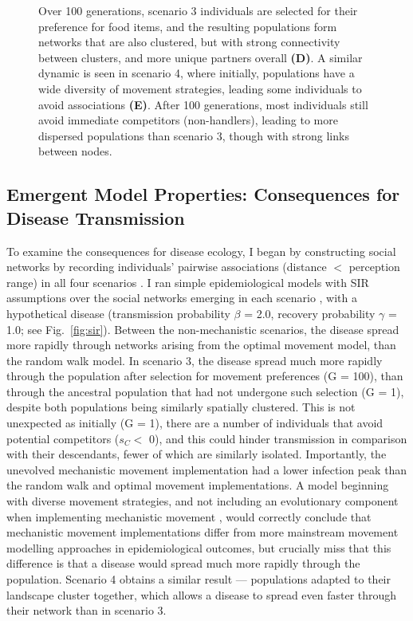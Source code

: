 \begin{figure}[p]
{        Over 100 generations, scenario 3 individuals are selected for their preference for food items, and the resulting populations form networks that are also clustered, but with strong connectivity between clusters, and more unique partners overall \textbf{(D)}.
        A similar dynamic is seen in scenario 4, where initially, populations have a wide diversity of movement strategies, leading some individuals to avoid associations \textbf{(E)}. After 100 generations, most individuals still avoid immediate competitors (non-handlers), leading to more dispersed populations than scenario 3, though with strong links between nodes.
    }
    \label{fig:networks}
  \end{figure}

\subsection*{Emergent Model Properties: Consequences for Disease Transmission}

To examine the consequences for disease ecology, I began by constructing social networks by recording individuals' pairwise associations (distance $<$ perception range) in all four scenarios \citep{farine2015}.
I ran simple epidemiological models with SIR assumptions over the social networks emerging in each scenario \citep[25 replicates per network; 1 network per scenario replicate][]{white2017,csardi2006,bailey1975}, with a hypothetical disease (transmission probability $\beta$ = 2.0, recovery probability $\gamma$ = 1.0; see Fig.~\ref{fig:sir}).
Between the non-mechanistic scenarios, the disease spread more rapidly through networks arising from the optimal movement model, than the random walk model.
In scenario 3, the disease spread much more rapidly through the population after selection for movement preferences (G = 100), than through the ancestral population that had not undergone such selection (G = 1), despite both populations being similarly spatially clustered.
This is not unexpected as initially (G = 1), there are a number of individuals that avoid potential competitors ($s_C <$ 0), and this could hinder transmission in comparison with their descendants, fewer of which are similarly isolated.
Importantly, the unevolved mechanistic movement implementation had a lower infection peak than the random walk and optimal movement implementations.
A model beginning with diverse movement strategies, and not including an evolutionary component when implementing mechanistic movement \citep[such as][]{white2018}, would correctly conclude that mechanistic movement implementations differ from more mainstream movement modelling approaches in epidemiological outcomes, but crucially miss that this difference is that a disease would spread much more rapidly through the population.
Scenario 4 obtains a similar result --- populations adapted to their landscape cluster together, which allows a disease to spread even faster through their network than in scenario 3.

